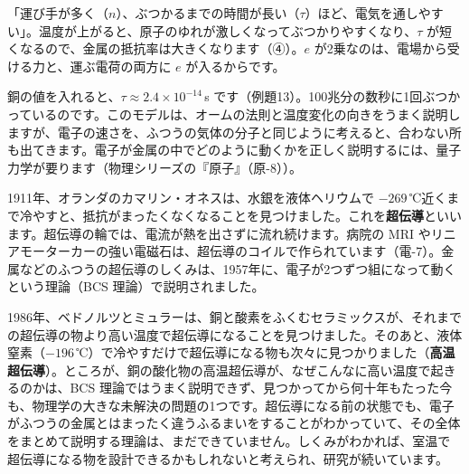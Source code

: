 \begin{phyomi}[$\sigma=\dfrac{ne^2\tau}{m_{\mathrm e}}$]
「運び手が多く（$n$）、ぶつかるまでの時間が長い（$\tau$）ほど、電気を通しやすい」。温度が上がると、原子のゆれが激しくなってぶつかりやすくなり、$\tau$ が短くなるので、金属の抵抗率は大きくなります（④）。$e$ が2乗なのは、電場から受ける力と、運ぶ電荷の両方に $e$ が入るからです。
\end{phyomi}

\noindent 銅の値を入れると、$\tau\approx2.4\times10^{-14}$\,s です（例題13）。100兆分の数秒に1回ぶつかっているのです。このモデルは、オームの法則と温度変化の向きをうまく説明しますが、電子の速さを、ふつうの気体の分子と同じように考えると、合わない所も出てきます。電子が金属の中でどのように動くかを正しく説明するには、量子力学が要ります（物理シリーズの『原子』（原-8））。

\begin{phmodel}[ドルーデのモデル]
\end{phmodel}

1911年、オランダのカマリン・オネスは、水銀を液体ヘリウムで $-269$\,℃近くまで冷やすと、抵抗がまったくなくなることを見つけました。これを\textbf{超伝導}といいます。超伝導の輪では、電流が熱を出さずに流れ続けます。病院の MRI やリニアモーターカーの強い電磁石は、超伝導のコイルで作られています（電-7）。金属などのふつうの超伝導のしくみは、1957年に、電子が2つずつ組になって動くという理論（BCS 理論）で説明されました。

\begin{phmada}
1986年、ベドノルツとミュラーは、銅と酸素をふくむセラミックスが、それまでの超伝導の物より高い温度で超伝導になることを見つけました。そのあと、液体窒素（$-196$\,℃）で冷やすだけで超伝導になる物も次々に見つかりました（\textbf{高温超伝導}）。ところが、銅の酸化物の高温超伝導が、なぜこんなに高い温度で起きるのかは、BCS 理論ではうまく説明できず、見つかってから何十年もたった今も、物理学の大きな未解決の問題の1つです。超伝導になる前の状態でも、電子がふつうの金属とはまったく違うふるまいをすることがわかっていて、その全体をまとめて説明する理論は、まだできていません。しくみがわかれば、室温で超伝導になる物を設計できるかもしれないと考えられ、研究が続いています。
\end{phmada}

